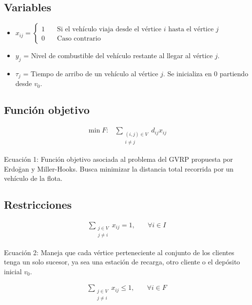 \documentclass[letter, 10pt]{article}
\begin{document}
\subsection{Variables}
\begin{itemize}
    \item     $x_{ij} = \left\{
        \begin{array}{ll}
            1 & \quad \text{Si el vehículo viaja desde el vértice $i$ hasta el vértice $j$} \\
            0 & \quad \text{Caso contrario}
        \end{array}
    \right.$
    \item $y_j$ = Nivel de combustible del vehículo restante al llegar al vértice $j$.
    \item $\tau_j$ = Tiempo de arribo de un vehículo al vértice $j$. Se inicializa en $0$ partiendo desde $v_0$.
\end{itemize}

\subsection{Función objetivo}
\begin{align}
    \min F:
    & \sum_{\substack{(i,j)\in V\\ i \neq j}} d_{ij} x_{ij}
\end{align}
\begin{center}
    Ecuación 1: Función objetivo asociada al problema del GVRP propuesta por Erdoğan y Miller-Hooks. Busca minimizar la distancia total recorrida por un vehículo de la flota.
\end{center}

\subsection{Restricciones}
\begin{align}
    \sum_{\substack{j\in V\\ j \neq i}} x_{ij} = 1, & \quad \forall i \in I
\end{align}

\begin{center}
    Ecuación 2: Maneja que cada vértice perteneciente al conjunto de los clientes tenga un solo sucesor, ya sea una estación de recarga, otro cliente o el depósito inicial $v_0$.
\end{center}

\begin{align}
    \sum_{\substack{j\in V\\ j \neq i}} x_{ij} \leq 1, & \quad \forall i \in F
\end{align}
\end{document}

